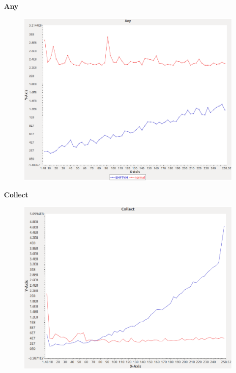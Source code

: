 \noindent\textbf{Any}

\begin{figure}[h]
\centering
\includegraphics[width=\textwidth]{graphs/bag/Any}
\end{figure}
\pagebreak

\noindent\textbf{Collect}

\begin{figure}[h]
\centering
\includegraphics[width=\textwidth]{graphs/bag/Collect}
\end{figure}
\pagebreak


